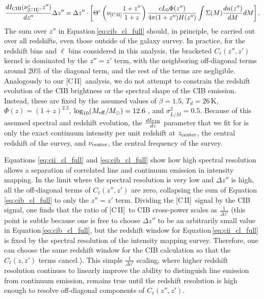 \documentclass[fleqn,usenatbib]{mnras}
\newcommand{\cii}{[C{\sc\,II}]}
\begin{document}
\begin{equation}
\frac{dI_{\rm CIB}(\nu_{\rm \cii}^z,z'')}{dz''}\Delta z'' =  \Delta z'' \cdot  \left[ \Theta^c \left(\nu_{\rm \cii}\frac{1+z''}{1+z}\right) \frac{cL_0\Phi(z'')}{4\pi(1+z'')H(z'')}\int\Sigma(M)\frac{dn(z'')}{dM}dM \right].
\end{equation}
The sum over $z''$ in Equation\,\ref{eq:cib_cl_full} should, in principle, be carried out over all redshifts, even those outside of the galaxy survey. In practice, for the redshift bins and $\ell$ bins considered in this analysis, the bracketed $C_{\ell}(z'',z')$ kernel is dominated by the $z''= z'$ term, with the neighboring off-diagonal terms around 20\% of the diagonal term, and the rest of the terms are negligible. Analogously to our \cii\ analysis, we do not attempt to constrain the redshift evolution of the CIB brightness or the spectral shape of the CIB emission. Instead, these are fixed by the assumed values of $\beta = 1.5$, $T_d=26$\,K, $\Phi(z) = (1+z)^{2.3}$, $\log_{10}(M_{\rm eff}/M_{\odot}) = 12.6$ , and $\sigma^2_{L/M}=0.5$. Because of this assumed spectral and redshift evolution, the $\frac{dI_{\rm CIB}}{dz}$ parameter that we fit for is only the exact continuum intensity per unit redshift at $z_{\rm center}$, the central redshift of the survey, and $\nu_{\rm center}$, the central frequency of the survey. 

Equations \ref{eq:cii_cl_full} and \ref{eq:cib_cl_full} show how high spectral resolution allows a separation of correlated line and continuum emission in intensity mapping. 
In the limit where the spectral resolution is very low and $\Delta z''$ is high, all the off-diagonal terms of $C_{\ell}(z'',z')$ are zero, collapsing the sum of Equation\,\ref{eq:cib_cl_full} to only the $z''=z'$ term. Dividing the \cii\ signal by the CIB signal, one finds that the ratio of \cii\ to CIB cross-power scales as $\frac{1}{\Delta z'}$ (this point is subtle because one is free to choose $\Delta z''$ to be an arbitrarily small value in Equation\,\ref{eq:cib_cl_full}, but the redshift window for Equation\,\ref{eq:cii_cl_full} is fixed by the spectral resolution of the intensity mapping survey. Therefore, one can choose the same redshift window for the CIB calculation so that the $C_{\ell}(z,z')$ terms cancel.). This simple $\frac{1}{\Delta z'}$ scaling, where higher redshift resolution continues to linearly improve the ability to distinguish line emission from continuum emission, remains true until the redshift resolution is high enough to resolve off-diagonal components of $C_{\ell}(z'',z')$.
\end{document}
